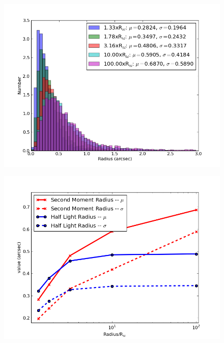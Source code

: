 \documentclass[]{article}
\begin{document}
{\begin{figure}[H]
\centering
\includegraphics[width=5in]{validation_figures/Second_moment_hist.png}
\caption{\label{fig:mom_hist}}
\end{figure}
\begin{figure}[H]
\centering
\includegraphics[width=5in]{validation_figures/sec_mom_half_light_mean_sigma.png}
\caption{\label{fig:mom_hl_line}}
\end{figure}

}
\end{document}
